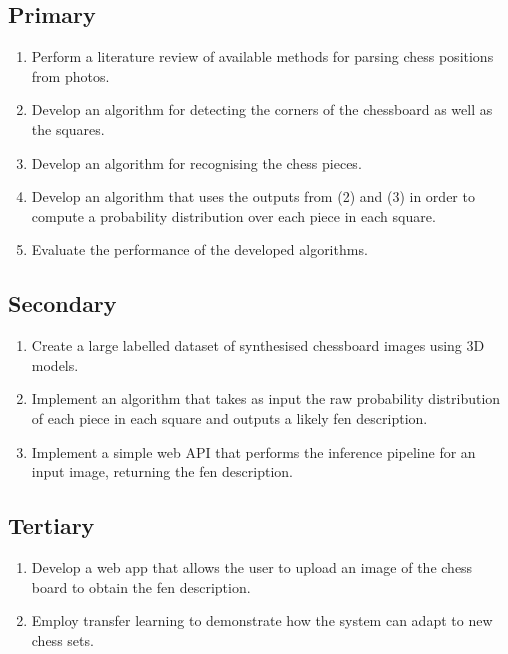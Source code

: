 \documentclass[../main.tex]{subfiles}
\begin{document}
\subsection{Primary}
\begin{enumerate}[label={A\arabic*.},ref={A\arabic*}]
    \item \label{obj:11} Perform a literature review of available methods for parsing chess positions from photos.
    \item \label{obj:12} Develop an algorithm for detecting the corners of the chessboard as well as the squares.
    \item \label{obj:13} Develop an algorithm for recognising the chess pieces.
    \item \label{obj:14} Develop an algorithm that uses the outputs from (2) and (3) in order to compute a probability distribution over each piece in each square.
    \item \label{obj:15} Evaluate the performance of the developed algorithms.
\end{enumerate}

\subsection{Secondary}
\begin{enumerate}[label={B\arabic*.},ref={B\arabic*}]
    \item \label{obj:21} Create a large labelled dataset of synthesised chessboard images using 3D models.
    \item \label{obj:22} Implement an algorithm that takes as input the raw probability distribution of each piece in each square and outputs a likely \gls{fen} description.
    \item \label{obj:23} Implement a simple web API that performs the inference pipeline for an input image, returning the \gls{fen} description. 
\end{enumerate}
\subsection{Tertiary}
\begin{enumerate}[label={C\arabic*.},ref={C\arabic*}]
    \item \label{obj:31} Develop a web app that allows the user to upload an image of the chess board to obtain the \gls{fen} description.
    \item \label{obj:32} Employ transfer learning to demonstrate how the system can adapt to new chess sets.
\end{enumerate}
\end{document}
